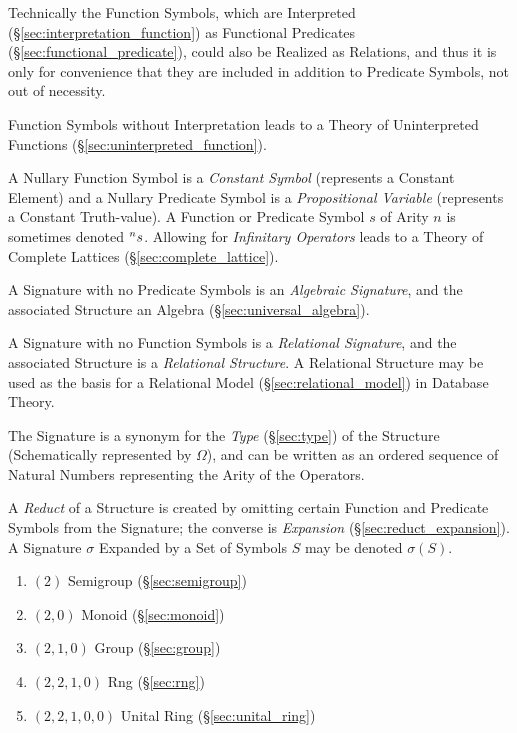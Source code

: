 Technically the Function Symbols, which are Interpreted
(\S\ref{sec:interpretation_function}) as Functional Predicates
(\S\ref{sec:functional_predicate}), could also be Realized as
Relations, and thus it is only for convenience that they are included
in addition to Predicate Symbols, not out of necessity.

Function Symbols without Interpretation leads to a Theory of
Uninterpreted Functions (\S\ref{sec:uninterpreted_function}).

A Nullary Function Symbol is a \emph{Constant Symbol} (represents a
Constant Element) and a Nullary Predicate Symbol is a
\emph{Propositional Variable} (represents a Constant Truth-value). A
Function or Predicate Symbol $s$ of Arity $n$ is sometimes denoted
$\prescript{n}{}{s}$. Allowing for \emph{Infinitary Operators} leads
to a Theory of Complete Lattices (\S\ref{sec:complete_lattice}).

A Signature with no Predicate Symbols is an \emph{Algebraic
  Signature}, and the associated Structure an Algebra
(\S\ref{sec:universal_algebra}).

A Signature with no Function Symbols is a \emph{Relational Signature},
and the associated Structure is a \emph{Relational Structure}. A
Relational Structure may be used as the basis for a Relational Model
(\S\ref{sec:relational_model}) in Database Theory.

The Signature is a synonym for the \emph{Type} (\S\ref{sec:type}) of
the Structure (Schematically represented by $\Omega$), and can be
written as an ordered sequence of Natural Numbers representing the
Arity of the Operators.

A \emph{Reduct} of a Structure is created by omitting certain Function
and Predicate Symbols from the Signature; the converse is
\emph{Expansion} (\S\ref{sec:reduct_expansion}). A Signature $\sigma$
Expanded by a Set of Symbols $S$ may be denoted $\sigma(S)$.

\begin{enumerate}
  \item $(2)$         Semigroup (\S\ref{sec:semigroup})
  \item $(2,0)$       Monoid (\S\ref{sec:monoid})
  \item $(2,1,0)$     Group (\S\ref{sec:group})
  \item $(2,2,1,0)$   Rng (\S\ref{sec:rng})
  \item $(2,2,1,0,0)$ Unital Ring (\S\ref{sec:unital_ring})
\end{enumerate}



